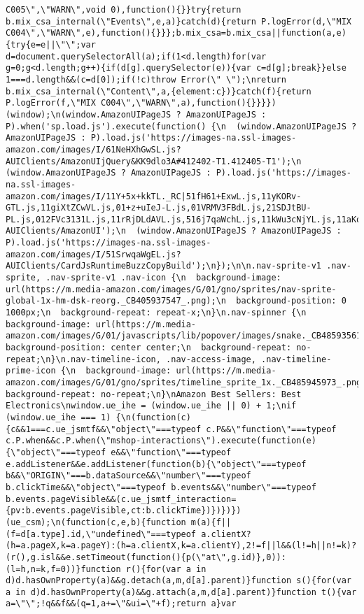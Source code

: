 \documentclass[
]{article}
\begin{document}
\begin{verbatim}
C005\",\"WARN\",void 0),function(){}}try{return b.mix_csa_internal(\"Events\",e,a)}catch(d){return P.logError(d,\"MIX C004\",\"WARN\",e),function(){}}};b.mix_csa=b.mix_csa||function(a,e){try{e=e||\"\";var d=document.querySelectorAll(a);if(1<d.length)for(var g=0;g<d.length;g++){if(d[g].querySelector(e)){var c=d[g];break}}else 1===d.length&&(c=d[0]);if(!c)throw Error(\" \");\nreturn b.mix_csa_internal(\"Content\",a,{element:c})}catch(f){return P.logError(f,\"MIX C004\",\"WARN\",a),function(){}}}})(window);\n(window.AmazonUIPageJS ? AmazonUIPageJS : P).when('sp.load.js').execute(function() {\n  (window.AmazonUIPageJS ? AmazonUIPageJS : P).load.js('https://images-na.ssl-images-amazon.com/images/I/61NeHXhGwSL.js?AUIClients/AmazonUIjQuery&KK9dlo3A#412402-T1.412405-T1');\n  (window.AmazonUIPageJS ? AmazonUIPageJS : P).load.js('https://images-na.ssl-images-amazon.com/images/I/11Y+5x+kkTL._RC|51fH61+ExwL.js,11yKORv-GTL.js,11giXtZCwVL.js,01+z+uIeJ-L.js,01VRMV3FBdL.js,21SDJtBU-PL.js,012FVc3131L.js,11rRjDLdAVL.js,516j7qaWchL.js,11kWu3cNjYL.js,11aKqyRXooL.js,11OREnu1epL.js,11qVTZscrRL.js,21ssiLNIZvL.js,0190vxtlzcL.js,51+N26vFcBL.js,01JYHc2oIlL.js,31nfKXylf6L.js,01ezj5Rkz1L.js,11bEz2VIYrL.js,31o2NGTXThL.js,01rpauTep4L.js,01wGRCg6A5L.js_.js?AUIClients/AmazonUI');\n  (window.AmazonUIPageJS ? AmazonUIPageJS : P).load.js('https://images-na.ssl-images-amazon.com/images/I/51SrwqaWgEL.js?AUIClients/CardJsRuntimeBuzzCopyBuild');\n});\n\n.nav-sprite-v1 .nav-sprite, .nav-sprite-v1 .nav-icon {\n  background-image: url(https://m.media-amazon.com/images/G/01/gno/sprites/nav-sprite-global-1x-hm-dsk-reorg._CB405937547_.png);\n  background-position: 0 1000px;\n  background-repeat: repeat-x;\n}\n.nav-spinner {\n  background-image: url(https://m.media-amazon.com/images/G/01/javascripts/lib/popover/images/snake._CB485935611_.gif);\n  background-position: center center;\n  background-repeat: no-repeat;\n}\n.nav-timeline-icon, .nav-access-image, .nav-timeline-prime-icon {\n  background-image: url(https://m.media-amazon.com/images/G/01/gno/sprites/timeline_sprite_1x._CB485945973_.png);\n  background-repeat: no-repeat;\n}\nAmazon Best Sellers: Best Electronics\nwindow.ue_ihe = (window.ue_ihe || 0) + 1;\nif (window.ue_ihe === 1) {\n(function(c){c&&1===c.ue_jsmtf&&\"object\"===typeof c.P&&\"function\"===typeof c.P.when&&c.P.when(\"mshop-interactions\").execute(function(e){\"object\"===typeof e&&\"function\"===typeof e.addListener&&e.addListener(function(b){\"object\"===typeof b&&\"ORIGIN\"===b.dataSource&&\"number\"===typeof b.clickTime&&\"object\"===typeof b.events&&\"number\"===typeof b.events.pageVisible&&(c.ue_jsmtf_interaction={pv:b.events.pageVisible,ct:b.clickTime})})})})(ue_csm);\n(function(c,e,b){function m(a){f||(f=d[a.type].id,\"undefined\"===typeof a.clientX?(h=a.pageX,k=a.pageY):(h=a.clientX,k=a.clientY),2!=f||l&&(l!=h||n!=k)?(r(),g.isl&&e.setTimeout(function(){p(\"at\",g.id)},0)):(l=h,n=k,f=0))}function r(){for(var a in d)d.hasOwnProperty(a)&&g.detach(a,m,d[a].parent)}function s(){for(var a in d)d.hasOwnProperty(a)&&g.attach(a,m,d[a].parent)}function t(){var a=\"\";!q&&f&&(q=1,a+=\"&ui=\"+f);return a}var 
\end{verbatim}
\end{document}
